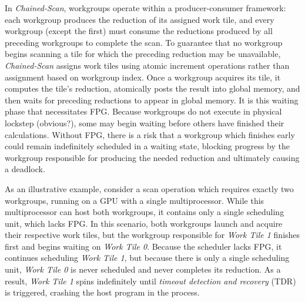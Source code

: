 \documentclass[sigconf]{acmart}
\begin{document}
In \emph{Chained-Scan}, workgroups operate within a producer-consumer framework: each workgroup produces the reduction of its assigned work tile, and every workgroup (except the first) must consume the reductions produced by all preceding workgroups to complete the scan. To guarantee that no workgroup begins scanning a tile for which the preceding reduction may be unavailable, \emph{Chained-Scan} assigns work tiles using atomic increment operations rather than assignment based on workgroup index. Once a workgroup acquires its tile, it computes the tile’s reduction, atomically posts the result into global memory, and then waits for preceding reductions to appear in global memory. It is this waiting phase that necessitates FPG. Because workgroups do not execute in physical lockstep (obvious?), some may begin waiting before others have finished their calculations. Without FPG, there is a risk that a workgroup which finishes early could remain indefinitely scheduled in a waiting state, blocking progress by the workgroup responsible for producing the needed reduction and ultimately causing a deadlock.

As an illustrative example, consider a scan operation which requires exactly two workgroups, running on a GPU with a single multiprocessor. While this multiprocessor can host both workgroups, it contains only a single scheduling unit, which lacks FPG. In this scenario, both workgroups launch and acquire their respective work tiles, but the workgroup responsible for \emph{Work Tile 1} finishes first and begins waiting on \emph{Work Tile 0}. Because the scheduler lacks FPG, it continues scheduling \emph{Work Tile 1}, but because there is only a single scheduling unit, \emph{Work Tile 0} is never scheduled and never completes its reduction. As a result, \emph{Work Tile 1} spins indefinitely until \emph{timeout detection and recovery} (TDR) is triggered, crashing the host program in the process.
\end{document}
